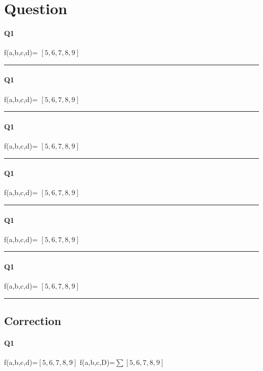 
\section{Question}

\paragraph{Q1}


f(a,b,c,d)= $[5, 6, 7, 8, 9]$

\hrule width 1\linewidth
\paragraph{Q1}


f(a,b,c,d)= $[5, 6, 7, 8, 9]$

\hrule width 1\linewidth
\paragraph{Q1}


f(a,b,c,d)= $[5, 6, 7, 8, 9]$

\hrule width 1\linewidth
\paragraph{Q1}


f(a,b,c,d)= $[5, 6, 7, 8, 9]$

\hrule width 1\linewidth
\paragraph{Q1}


f(a,b,c,d)= $[5, 6, 7, 8, 9]$

\hrule width 1\linewidth
\paragraph{Q1}


f(a,b,c,d)= $[5, 6, 7, 8, 9]$

\hrule width 1\linewidth\pagebreak
\subsection{Correction}

\paragraph{Q1}

f(a,b,c,d)=$[5, 6, 7, 8, 9]$
f(a,b,c,D)=$ \sum [5, 6, 7, 8, 9] $ 

